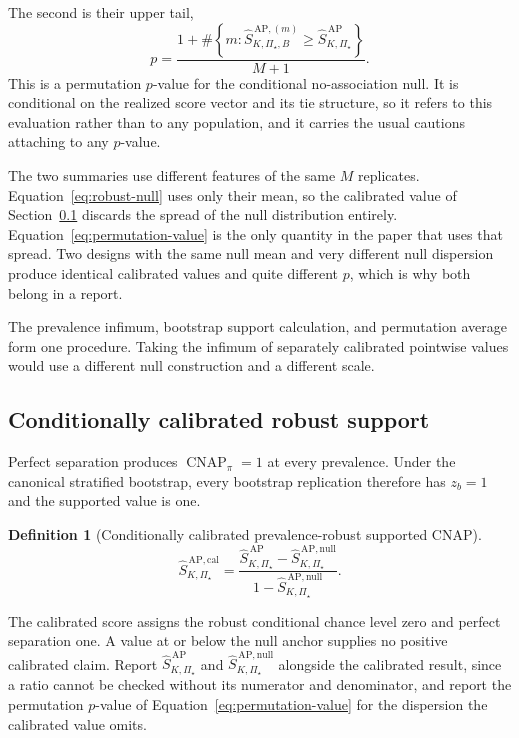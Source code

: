 \documentclass[11pt]{article}
\newcommand{\CNAP}{\operatorname{CNAP}}
\newcommand{\PSet}{\Pi_\star}
\newcommand{\SRobHat}{\widehat S_{K,\PSet}^{\,\mathrm{AP}}}
\newcommand{\SRobNullHat}{\widehat S_{K,\PSet}^{\,\mathrm{AP,null}}}
\newcommand{\SRobCalHat}{\widehat S_{K,\PSet}^{\,\mathrm{AP,cal}}}
\newtheorem{definition}{Definition}
\theoremstyle{remark}
\begin{document}
The second is their upper tail,
\begin{equation}
p
=
\frac{
1+
\#\left\{
m:
\widehat S_{K,\PSet,B}^{\,\mathrm{AP},(m)}
\geq
\SRobHat
\right\}
}{M+1}.
\label{eq:permutation-value}
\end{equation}
This is a permutation $p$-value for the conditional no-association null. It is conditional on the realized score vector and its tie structure, so it refers to this evaluation rather than to any population, and it carries the usual cautions attaching to any $p$-value.

The two summaries use different features of the same $M$ replicates. Equation~\eqref{eq:robust-null} uses only their mean, so the calibrated value of Section~\ref{sec:calibration-def} discards the spread of the null distribution entirely. Equation~\eqref{eq:permutation-value} is the only quantity in the paper that uses that spread. Two designs with the same null mean and very different null dispersion produce identical calibrated values and quite different $p$, which is why both belong in a report.

The prevalence infimum, bootstrap support calculation, and permutation average form one procedure. Taking the infimum of separately calibrated pointwise values would use a different null construction and a different scale.

\subsection{Conditionally calibrated robust support}
\label{sec:calibration-def}

Perfect separation produces $\CNAP_\pi=1$ at every prevalence. Under the canonical stratified bootstrap, every bootstrap replication therefore has $z_b=1$ and the supported value is one.

\begin{definition}[Conditionally calibrated prevalence-robust supported CNAP]
\begin{equation}
\SRobCalHat
=
\frac{
\SRobHat-\SRobNullHat
}{
1-\SRobNullHat
}.
\label{eq:robust-calibration}
\end{equation}
\end{definition}

The calibrated score assigns the robust conditional chance level zero and perfect separation one. A value at or below the null anchor supplies no positive calibrated claim. Report $\SRobHat$ and $\SRobNullHat$ alongside the calibrated result, since a ratio cannot be checked without its numerator and denominator, and report the permutation $p$-value of Equation~\eqref{eq:permutation-value} for the dispersion the calibrated value omits.
\end{document}
